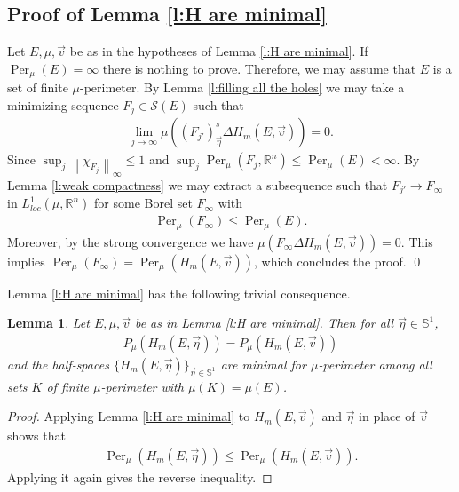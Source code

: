 \documentclass[12pt]{amsart}
\numberwithin{equation}{section}
\theoremstyle{plain}
\newtheorem{lemma}[theorem]{Lemma}
\theoremstyle{definition}
\newcommand{\norm}[1]{\left\lVert#1\right\rVert}
\begin{document}
\subsection{Proof of Lemma \ref{l:H are minimal}}
Let $E, \mu, \vec{v}$ be as in the hypotheses of Lemma \ref{l:H are minimal}. If $\operatorname{Per}_\mu(E) = \infty$ there is nothing to prove.  Therefore, we may assume that $E$ is a set of finite $\mu$-perimeter. By Lemma \ref{l:filling all the holes} we may take a minimizing sequence $F_{j} \in \mathcal{S}(E)$ such that 
\begin{align*}
    \lim_{j \rightarrow \infty} \mu((F_{j'})^s_{\vec{\eta}} \Delta H_m(E, \vec{v}))=0.
\end{align*}
Since $\sup_j \norm{\chi_{F_{j}}}_{\infty} \le 1$ and $\sup_j \operatorname{Per}_{\mu}(F_j, \mathbb{R}^n) \le \operatorname{Per}_{\mu}(E)<\infty$. By Lemma \ref{l:weak compactness} we may extract a subsequence such that $F_{j'} \rightarrow F_{\infty}$ in $L^1_{loc}(\mu, \mathbb{R}^n)$ for some Borel set $F_{\infty}$ with 
\begin{align*}
    \operatorname{Per}_{\mu}(F_{\infty}) \le \operatorname{Per}_\mu(E).
\end{align*}
Moreover, by the strong convergence we have $\mu(F_{\infty} \Delta H_m(E, \vec{v})) = 0$. This implies $\operatorname{Per}_{\mu}(F_{\infty}) = \operatorname{Per}_{\mu}(H_m(E, \vec{v}))$, which concludes the proof. \qed


\vspace{.5cm}
Lemma \ref{l:H are minimal} has the following trivial consequence.

\begin{lemma}\label{l:all half-spaces}
    Let $E, \mu, \vec{v}$ be as in Lemma \ref{l:H are minimal}.  Then for all $\vec{\eta} \in \mathbb{S}^1$,  
    \begin{align*}
        P_{\mu}(H_m(E, \vec{\eta})) = P_{\mu}(H_m(E, \vec{v}))
    \end{align*}
    and the half-spaces $\{H_m(E, \vec{\eta})\}_{\vec{\eta} \in \mathbb{S}^1}$ are minimal for $\mu$-perimeter among all sets $K$ of finite $\mu$-perimeter with $\mu(K) = \mu(E)$.
\end{lemma}

\begin{proof}
    Applying Lemma \ref{l:H are minimal} to $H_m(E, \vec{v})$ and $\vec{\eta}$ in place of $\vec{v}$ shows that 
    \begin{align*}
        \operatorname{Per}_{\mu}(H_m(E, \vec{\eta})) \le \operatorname{Per}_{\mu}(H_m(E, \vec{v})).
    \end{align*}
    Applying it again gives the reverse inequality.   
\end{proof}
\end{document}
